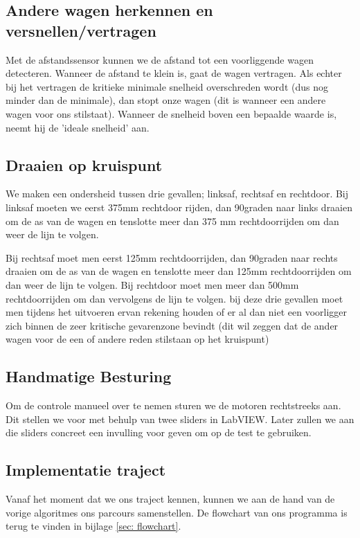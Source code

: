 \documentclass[a4paper,twoside,kulak]{kulakreport}
\begin{document}
\subsection{Andere wagen herkennen en versnellen/vertragen}

Met de afstandssensor kunnen we de afstand tot een voorliggende wagen detecteren. Wanneer de afstand te klein is, gaat de wagen vertragen. Als echter bij het vertragen de kritieke minimale snelheid overschreden wordt (dus nog minder dan de minimale), dan stopt onze wagen (dit is wanneer een andere wagen voor ons stilstaat). Wanneer de snelheid boven een bepaalde waarde is, neemt hij de 'ideale snelheid' aan.

\subsection{Draaien op kruispunt}
We maken een ondersheid tussen drie gevallen; linksaf, rechtsaf en rechtdoor. Bij linksaf moeten we eerst 375mm rechtdoor rijden, dan 90graden naar links draaien om de as van de wagen en tenslotte meer dan 375 mm rechtdoorrijden om dan weer de lijn te volgen.

Bij rechtsaf moet men eerst 125mm rechtdoorrijden, dan 90graden naar rechts draaien om de as van de wagen en tenslotte meer dan 125mm rechtdoorrijden om dan weer de lijn te volgen. Bij rechtdoor moet men meer dan 500mm rechtdoorrijden om dan vervolgens de lijn te volgen. bij deze drie gevallen moet men tijdens het uitvoeren ervan rekening houden of er al dan niet een voorligger zich binnen de zeer kritische gevarenzone bevindt (dit wil zeggen dat de ander wagen voor de een of andere reden stilstaan op het kruispunt)

\subsection{Handmatige Besturing}
Om de controle manueel over te nemen sturen we de motoren rechtstreeks aan. Dit stellen we voor met behulp van twee sliders in LabVIEW. Later zullen we aan die sliders concreet een invulling voor geven om op de test te gebruiken.

\subsection{Implementatie traject}

Vanaf het moment dat we ons traject kennen, kunnen we aan de hand van de vorige algoritmes ons parcours samenstellen. De flowchart van ons programma is terug te vinden in bijlage \ref{sec: flowchart}.
\end{document}
